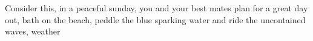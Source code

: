 Consider this, in a peaceful sunday, you and your best mates plan for a great day out, bath on the beach, peddle the blue sparking water and ride the uncontained waves, weather 